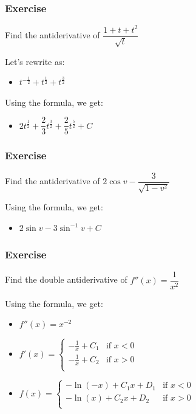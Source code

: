 \documentclass[t]{beamer}
\theoremstyle{plain}
\theoremstyle{definition}
\begin{document}
\begin{frame}

\frametitle{Exercise}

Find the antiderivative of $\dfrac{1 + t + t^2}{\sqrt{t}}$

\medskip

Let's rewrite as:
\begin{itemize}
	\item $t^{-\frac{1}{2}} + t^{\frac{1}{2}} + t^{\frac{3}{2}}$
\end{itemize}

Using the formula, we get:
\begin{itemize}
	\item $2t^{\frac{1}{2}} + \dfrac{2}{3}t^{\frac{3}{2}} + \dfrac{2}{5}t^{\frac{5}{2}} + C$
\end{itemize}

\end{frame}

\begin{frame}

\frametitle{Exercise}

Find the antiderivative of $2\cos{v} - \dfrac{3}{\sqrt{1-v^2}}$

\medskip

Using the formula, we get:
\begin{itemize}
	\item $2\sin{v} - 3\sin^{-1}v + C$
\end{itemize}

\end{frame}

\begin{frame}

\frametitle{Exercise}

Find the double antiderivative of $f''(x) =\dfrac{1}{x^2}$

\medskip

Using the formula, we get:
\begin{itemize}
	\item $f''(x) =x^{-2}$
	\item $f'(x) = \begin{cases}
        -\frac{1}{x} + C_1 & \text{if } x < 0\\
        -\frac{1}{x} + C_2 & \text{if } x > 0\\
        \end{cases}$
     \item $f(x) = \begin{cases}
     -\ln(-x) + C_1{x} + D_1 & \text{if } x < 0\\
     -\ln(x) + C_2{x} + D_2 & \text{if } x > 0\\
     \end{cases}$
\end{itemize}

\end{frame}
\end{document}

